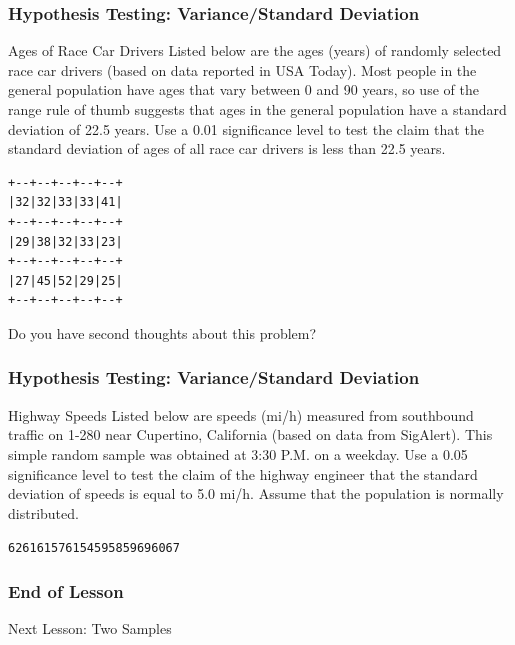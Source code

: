\documentclass[xcolor=dvipsnames]{beamer}
\begin{document}
\begin{frame}[fragile]
  \frametitle{Hypothesis Testing:
    Variance/Standard Deviation}
{\ubung} Ages of Race Car Drivers Listed below are the ages (years) of
randomly selected race car drivers (based on data reported in USA
Today). Most people in the general population have ages that vary
between 0 and 90 years, so use of the range rule of thumb suggests
that ages in the general population have a standard deviation of
22.5 years. Use a 0.01 significance level to test the claim that
the standard deviation of ages of all race car drivers is less
than 22.5 years. 
\begin{verbatim}
+--+--+--+--+--+
|32|32|33|33|41|
+--+--+--+--+--+
|29|38|32|33|23|
+--+--+--+--+--+
|27|45|52|29|25|
+--+--+--+--+--+
\end{verbatim}
Do you have second thoughts about
this problem?
\end{frame}

\begin{frame}[fragile]
  \frametitle{Hypothesis Testing: Variance/Standard Deviation}
  {\ubung} Highway Speeds Listed below are speeds (mi/h) measured
  from southbound traffic on 1-280 near Cupertino, California
  (based on data from SigAlert). This simple random sample was
  obtained at 3:30 P.M. on a weekday. Use a 0.05 significance
  level to test the claim of the highway engineer that the
  standard deviation of speeds is equal to 5.0 mi/h. Assume that
  the population is normally distributed.
\begin{alltt}
62 61 61 57 61 54 59 58 59 69 60 67
\end{alltt}
\end{frame}

\begin{frame}
  \frametitle{End of Lesson}
Next Lesson: Two Samples
\end{frame}
\end{document}

